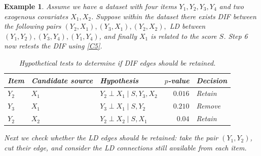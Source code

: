 \documentclass[12pt]{article}
\theoremstyle{examplestyle}
\newtheorem{example}{Example}[section]
\begin{document}
\begin{mybox3}
\begin{example}
Assume we have a dataset with four items $Y_1,Y_2,Y_3,Y_4$ and two exogenous covariates $X_1,X_2$. Suppose within the dataset there exists DIF between the following pairs $(Y_2,X_1), (Y_3,X_1), (Y_2,X_2),$ LD between $(Y_1,Y_2), (Y_3,Y_4), (Y_1,Y_4)$, and finally $X_1$ is related to the score $S$. Step 6 now retests the DIF using \eqref{C5}.
\begin{table}[H]
\centering
\begin{tabular}{l l l r l}
\hline
Item & Candidate source & Hypothesis & $p$-value & Decision \\
\hline
$Y_2$ & $X_1$ & $Y_2 \perp X_1 \mid S, Y_3,X_2$ & $0.016$ & Retain\\
$Y_3$ & $X_1$ & $Y_3 \perp X_1 \mid S,Y_2$ & $0.210$ & Remove\\
$Y_2$ & $X_2$ & $Y_2 \perp X_2 \mid S,X_1$ & $0.04$ & Retain \\
\hline
\end{tabular}
\caption{Hypothetical tests to determine if DIF edges should be retained.}
\label{tab:step6_dif_example}
\end{table}
Next we check whether the LD edges should be retained: take the pair $(Y_1,Y_2)$, cut their edge, and consider the LD connections still available from each item.
\begin{center}
\end{center}
\end{example}
\end{mybox3}
\end{document}
